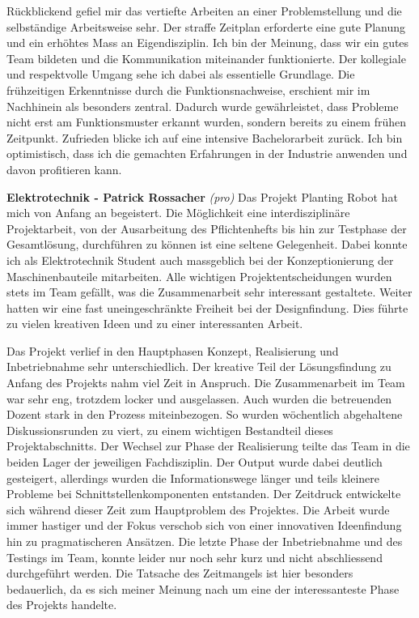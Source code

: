 Rückblickend gefiel mir das vertiefte Arbeiten an einer Problemstellung und die selbständige Arbeitsweise sehr. Der straffe Zeitplan erforderte eine gute Planung und ein erhöhtes Mass an Eigendisziplin. Ich bin der Meinung, dass wir ein gutes Team bildeten und die Kommunikation miteinander funktionierte. Der kollegiale und respektvolle Umgang sehe ich dabei als essentielle Grundlage. Die frühzeitigen Erkenntnisse durch die Funktionsnachweise, erschient mir im Nachhinein als besonders zentral. Dadurch wurde gewährleistet, dass Probleme nicht erst am Funktionsmuster erkannt wurden, sondern bereits zu einem frühen Zeitpunkt.
\newline
Zufrieden blicke ich auf eine intensive Bachelorarbeit zurück. Ich bin optimistisch, dass ich die gemachten Erfahrungen in der Industrie anwenden und davon profitieren kann.
\newline

\textbf{Elektrotechnik - Patrick Rossacher}
\newline
\textit{(pro)} Das Projekt Planting Robot hat mich von Anfang an begeistert. Die Möglichkeit eine interdisziplinäre Projektarbeit, von der Ausarbeitung des Pflichtenhefts bis hin zur Testphase der Gesamtlösung, durchführen zu können ist eine seltene Gelegenheit. Dabei konnte ich als Elektrotechnik Student auch massgeblich bei der Konzeptionierung der Maschinenbauteile mitarbeiten. Alle wichtigen Projektentscheidungen wurden stets im Team gefällt, was die Zusammenarbeit sehr interessant gestaltete. Weiter hatten wir eine fast uneingeschränkte Freiheit bei der Designfindung. Dies führte zu vielen kreativen Ideen und zu einer interessanten Arbeit.
\newline
	
Das Projekt verlief in den Hauptphasen Konzept, Realisierung und Inbetriebnahme sehr unterschiedlich. Der kreative Teil der Lösungsfindung zu Anfang des Projekts nahm viel Zeit in Anspruch. Die Zusammenarbeit im Team war sehr eng, trotzdem locker und ausgelassen. Auch wurden die betreuenden Dozent stark in den Prozess miteinbezogen. So wurden wöchentlich abgehaltene Diskussionsrunden zu viert, zu einem wichtigen Bestandteil dieses Projektabschnitts. Der Wechsel zur Phase der Realisierung teilte das Team in die beiden Lager der jeweiligen Fachdisziplin. Der Output wurde dabei deutlich gesteigert, allerdings wurden die Informationswege länger und teils kleinere Probleme bei Schnittstellenkomponenten entstanden. Der Zeitdruck entwickelte sich während dieser Zeit zum Hauptproblem des Projektes. Die Arbeit wurde immer hastiger und der Fokus verschob sich von einer innovativen Ideenfindung hin zu pragmatischeren Ansätzen. Die letzte Phase der Inbetriebnahme und des Testings im Team, konnte leider nur noch sehr kurz und nicht abschliessend durchgeführt werden. Die Tatsache des Zeitmangels ist hier besonders bedauerlich, da es sich meiner Meinung nach um eine der interessanteste Phase des Projekts handelte.
\newline


